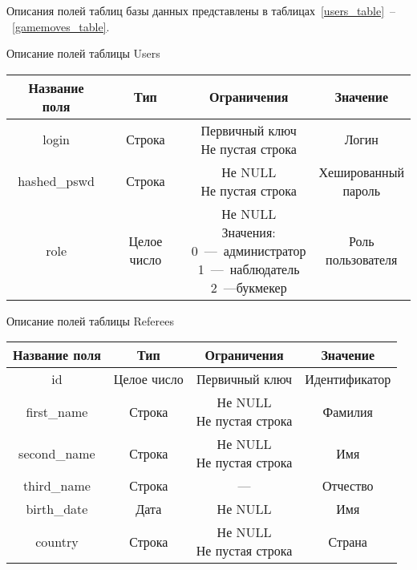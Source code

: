 Описания полей таблиц базы данных представлены в таблицах~\ref{users_table}~--~\ref{gamemoves_table}.
\begin{center}
	\begin{threeparttable}
		\captionsetup{justification=raggedright,singlelinecheck=off}
		\caption{\label{users_table}Описание полей таблицы Users}
		\centering
		\begin{tabular}{|c|c|c|c|}
			\hline
			Название поля & Тип & Ограничения & Значение \\
			\hline
			login & Строка & \specialcell{Первичный ключ\\Не пустая строка} & Логин \\
			\hline
			hashed\_pswd & Строка & \specialcell{Не NULL\\Не пустая строка} & \specialcell{Хешированный\\пароль} \\
			\hline
			role & Целое число & \specialcell{Не NULL\\Значения:\\0~---~администратор\\1~---~наблюдатель\\2~---букмекер} & \specialcell{Роль\\пользователя} \\
			\hline
		\end{tabular}
	\end{threeparttable}
\end{center}
\begin{center}
	\begin{threeparttable}
		\captionsetup{justification=raggedright,singlelinecheck=off}
		\caption{\label{referees_table}Описание полей таблицы Referees}
		\centering
		\begin{tabular}{|c|c|c|c|}
			\hline
			Название поля & Тип & Ограничения & Значение \\
			\hline
			id & Целое число & Первичный ключ & Идентификатор \\
			\hline
			first\_name & Строка & \specialcell{Не NULL\\Не пустая строка} & Фамилия \\
			\hline
			second\_name & Строка & \specialcell{Не NULL\\Не пустая строка} & Имя \\
			\hline
			third\_name & Строка & --- & Отчество \\
			\hline
			birth\_date & Дата & Не NULL & Имя \\
			\hline
			country & Строка & \specialcell{Не NULL\\Не пустая строка} & Страна \\
			\hline
		\end{tabular}
	\end{threeparttable}
\end{center}
